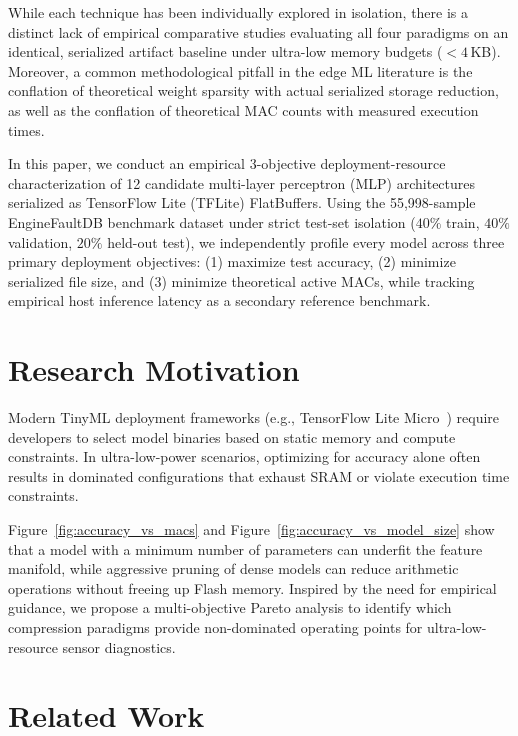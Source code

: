 \documentclass[journal,10pt]{IEEEtran}
\begin{document}
While each technique has been individually explored in isolation, there is a distinct lack of empirical comparative studies evaluating all four paradigms on an identical, serialized artifact baseline under ultra-low memory budgets ($<4$\,KB). Moreover, a common methodological pitfall in the edge ML literature is the conflation of theoretical weight sparsity with actual serialized storage reduction, as well as the conflation of theoretical MAC counts with measured execution times.

In this paper, we conduct an empirical 3-objective deployment-resource characterization of 12 candidate multi-layer perceptron (MLP) architectures serialized as TensorFlow Lite (TFLite) FlatBuffers. Using the 55,998-sample EngineFaultDB benchmark dataset under strict test-set isolation ($40\%$ train, $40\%$ validation, $20\%$ held-out test), we independently profile every model across three primary deployment objectives: (1) maximize test accuracy, (2) minimize serialized file size, and (3) minimize theoretical active MACs, while tracking empirical host inference latency as a secondary reference benchmark.

\section{Research Motivation}
Modern TinyML deployment frameworks (e.g., TensorFlow Lite Micro~\cite{david2021tensorflow}) require developers to select model binaries based on static memory and compute constraints. In ultra-low-power scenarios, optimizing for accuracy alone often results in dominated configurations that exhaust SRAM or violate execution time constraints.

Figure~\ref{fig:accuracy_vs_macs} and Figure~\ref{fig:accuracy_vs_model_size} show that a model with a minimum number of parameters can underfit the feature manifold, while aggressive pruning of dense models can reduce arithmetic operations without freeing up Flash memory. Inspired by the need for empirical guidance, we propose a multi-objective Pareto analysis to identify which compression paradigms provide non-dominated operating points for ultra-low-resource sensor diagnostics.

\section{Related Work}
\end{document}
